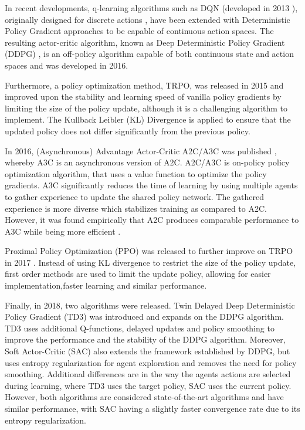 In recent developments, q-learning algorithms such as DQN (developed in 2013 \cite{mnihAsynchronousMethodsDeep2016}), originally designed for discrete actions \cite{suttonReinforcementLearningIntroduction2014}, have been extended with Deterministic Policy Gradient approaches \cite{silverDeterministicPolicyGradient} to be capable of continuous action spaces. The resulting actor-critic algorithm, known as Deep Deterministic Policy Gradient (DDPG) \cite{lillicrapContinuousControlDeep2019}, is an off-policy algorithm capable of both continuous state and action spaces  and was developed in 2016. 

Furthermore, a policy optimization method, TRPO, was released in 2015 \cite{schulmanTrustRegionPolicy2017} and improved upon the stability and learning speed of vanilla policy gradients by limiting the size of the policy update, although it is a challenging algorithm to implement. The Kullback Leibler (KL) Divergence is applied to ensure that the updated policy does not differ significantly from the previous policy.

In 2016, (Asynchronous) Advantage Actor-Critic A2C/A3C was published \cite{mnihAsynchronousMethodsDeep2016}, whereby A3C is an asynchronous version of A2C. A2C/A3C is on-policy policy optimization algorithm, that uses a value function to optimize the policy gradients. A3C significantly reduces the time of learning by using multiple agents to gather experience to update the shared policy network. The gathered experience is more diverse which stabilizes training as compared to A2C. However, it was found empirically that A2C produces comparable performance to A3C while being more efficient \cite{yoonUnderstandingActorCritic2019}.


Proximal Policy Optimization (PPO) was released to further improve on TRPO in 2017 \cite{schulmanProximalPolicyOptimization2017}. Instead of using KL divergence to restrict the size of the policy update, first order methods are used to limit the update policy, allowing for easier implementation,faster learning and similar performance.

Finally, in 2018, two algorithms were released. Twin Delayed Deep Deterministic Policy Gradient (TD3) was introduced \cite{fujimotoAddressingFunctionApproximation2018} and expands on the DDPG algorithm. TD3 uses additional Q-functions, delayed updates and policy smoothing to improve the performance and the stability of the DDPG algorithm. Moreover, Soft Actor-Critic (SAC) also extends the framework established by DDPG, but uses entropy regularization for agent exploration and removes the need for policy smoothing. Additional differences are in the way the agents actions are selected during learning, where TD3 uses the target policy, SAC uses the current policy. However, both algorithms are considered state-of-the-art algorithms and have similar performance, with SAC having a slightly faster convergence rate due to its entropy regularization. 

